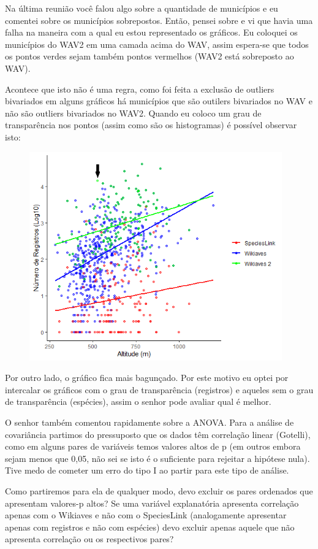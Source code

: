 \documentclass[12pt]{extarticle}
\begin{document}
Na última reunião você falou algo sobre a quantidade de municípios e eu comentei sobre os municípios sobrepostos. Então, pensei sobre e vi que havia uma falha na maneira com a qual eu estou representado os gráficos. Eu coloquei os municípios do WAV2 em uma camada acima do WAV, assim espera-se que todos os pontos verdes sejam também pontos vermelhos (WAV2 está sobreposto ao WAV). 

Acontece que isto não é uma regra, como foi feita a exclusão de outliers bivariados em alguns gráficos há municípios que são outilers bivariados no WAV e não são outliers bivariados no WAV2. Quando eu coloco um grau de transparência nos pontos (assim como são os histogramas) é possível observar isto:

\begin{figure}[h!]
\centering
\includegraphics[height = 9cm]{Imagens/A.png}
\end{figure}

Por outro lado, o gráfico fica mais bagunçado. Por este motivo eu optei por intercalar os gráficos com o grau de transparência (registros) e aqueles sem o grau de transparência (espécies), assim o senhor pode avaliar qual é melhor.

O senhor também comentou rapidamente sobre a ANOVA. Para a análise de covariância partimos do pressuposto que os dados têm correlação linear (Gotelli), como em alguns pares de variáveis temos valores altos de p (em outros embora sejam menos que 0,05, não sei se isto é o suficiente para rejeitar a hipótese nula). Tive medo de cometer um erro do tipo I ao partir para este tipo de análise.

Como partiremos para ela de qualquer modo, devo excluir os pares ordenados que apresentam valores-p altos? Se uma variável explanatória apresenta correlação apenas com o Wikiaves e não com o SpeciesLink (analogamente apresentar apenas com registros e não com espécies) devo excluir apenas aquele que não apresenta correlação ou os respectivos pares?
\end{document}
